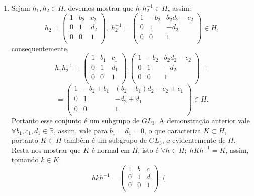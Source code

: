 \documentclass{article}
\begin{document}
\begin{enumerate}
		\item Sejam $h_{1}, h_{2} \in H$, devemos mostrar que $h_{1}h_{2}^{-1} \in H$, assim:
		$$
		h_{2} = \left(
		\begin{array}{ccc}
		1 & b_{2} & c_{2} \\
		0 & 1 & d_{2} \\
		0 & 0 & 1 \\
		\end{array}
		\right), \; 
		h_{2}^{-1} = \left(
		\begin{array}{ccc}
		1 & -b_{2} & b_{2}d_{2} - c_{2}\\
		0 & 1 & -d_{2} \\
		0 & 0 & 1 \\
		\end{array}
		\right) \in H,
		$$
		consequentemente,
		$$
		h_{1}h_{2}^{-1} = \left(
		\begin{array}{ccc}
		1 & b_{1} & c_{1} \\
		0 & 1 & d_{1} \\
		0 & 0 & 1 \\
		\end{array}
		\right).
		\left(
		\begin{array}{ccc}
		1 & -b_{2} & b_{2}d_{2} - c_{2}\\
		0 & 1 & -d_{2} \\
		0 & 0 & 1 \\
		\end{array}
		\right) = 
		$$
		$$
		= 		\left(
		\begin{array}{ccc}
		1 & -b_{2}+b_{1} & (b_{2}- b_{1})d_{2} - c_{2} +c_{1}\\
		0 & 1 & -d_{2} + d_{1}\\
		0 & 0 & 1 \\
		\end{array}
		\right) \in H.
		$$
		Portanto esse conjunto é um subgrupo de $GL_{3}$.
		A demonstração anterior vale $\forall b_{1}, c_{1}, d_{1} \in \mathbb{R}$, assim, vale para $b_{1}=d_{1}=0$, o que caracteriza $K \subset H$, portanto $K \subset H$ também é um subgrupo de $GL_{3}$, e evidentemente de $H$. Resta-nos mostrar que $K$ é normal em $H$, isto é $\forall h \in H; \; hKh^{-1} = K$, assim, tomando $k \in K$:
		$$
		hkh^{-1} = \left(
		\begin{array}{ccc}
		1 & b & c\\
		0 & 1 & d \\
		0 & 0 & 1 \\
		\end{array}
		\right).
		\left(
		\begin{array}{ccc}

\end{array}$$
\end{enumerate}
\end{document}

